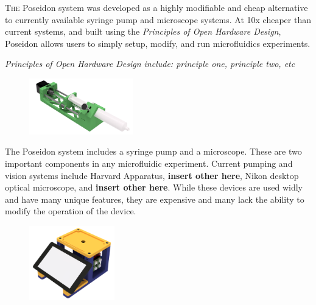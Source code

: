 \documentclass[10pt]{article} %
\begin{document}
	\begin{minipage}[t]{.66\linewidth} %
		
		\hypertarget{firstnews}{} %
		\lettrine[lraise=0.1, nindent=0em, slope=-.5em]{T}{he} Poseidon system was developed as a highly modifiable and cheap alternative to currently available syringe pump and microscope systems. At 10x cheaper than current systems, and built using the \textit{Principles of Open Hardware Design}, Poseidon allows users to simply setup, modify, and run microfluidics experiments.
		
		\begin{center}
			\parbox[t]{.70\linewidth}{\emph{Principles of Open Hardware Design include: principle one, principle two, etc}}
		\end{center}
		
		\begin{figure} %
			\includegraphics[width=0.4\textwidth]{img/pump-ortho.png}
		\end{figure}
		The Poseidon system includes a syringe pump and a microscope. These are two important components in any microfluidic experiment. Current pumping and vision systems include Harvard Apparatus, \textbf{insert other here}, Nikon desktop optical microscope, and \textbf{insert other here}. While these devices are used widly and have many unique features, they are expensive and many lack the ability to modify the operation of the device. 

		\begin{figure} %
			\includegraphics[width=0.33\textwidth]{img/cam-ortho.png}
		\end{figure}
		

\end{minipage}
\end{document}

